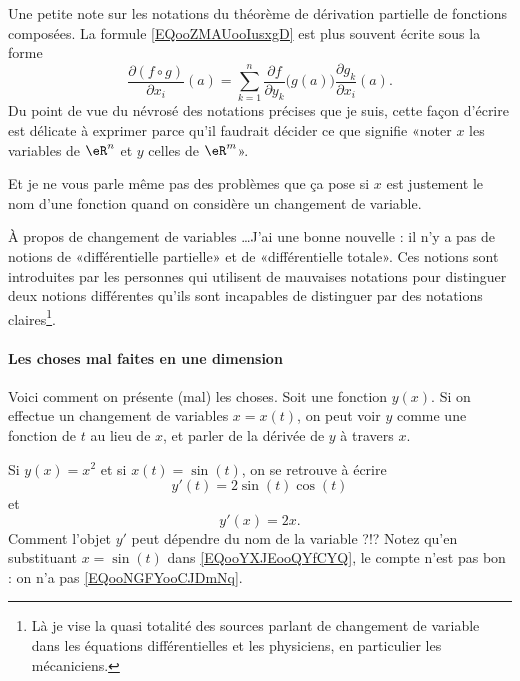 \begin{normaltext}
    Une petite note sur les notations du théorème de dérivation partielle de fonctions composées. La formule \eqref{EQooZMAUooIusxgD} est plus souvent écrite sous la forme
    \begin{equation}
		\frac{ \partial (f\circ g) }{ \partial x_i }(a)=\sum_{k=1}^n\frac{ \partial f }{ \partial y_k }\big( g(a) \big)\frac{ \partial g_k }{ \partial x_i }(a).
    \end{equation}
    Du point de vue du névrosé des notations précises que je suis, cette façon d'écrire est délicate à exprimer parce qu'il faudrait décider ce que signifie «noter \( x\) les variables de \( \eR^n\) et \( y\) celles de \( \eR^m\)».

    Et je ne vous parle même pas des problèmes que ça pose si \( x\) est justement le nom d'une fonction quand on considère un changement de variable.
\end{normaltext}

\begin{normaltext}
    À propos de changement de variables \ldots J'ai une bonne nouvelle : il n'y a pas de notions de «différentielle partielle» et de «différentielle totale». Ces notions sont introduites par les personnes qui utilisent de mauvaises notations pour distinguer deux notions différentes qu'ils sont incapables de distinguer par des notations claires\footnote{Là je vise la quasi totalité des sources parlant de changement de variable dans les équations différentielles et les physiciens, en particulier les mécaniciens.}.
\end{normaltext}

\paragraph{Les choses mal faites en une dimension}

    Voici comment on présente (mal) les choses. Soit une fonction \( y(x)\). Si on effectue un changement de variables \( x=x(t)\), on peut voir \( y\) comme une fonction de \( t\) au lieu de \( x\), et parler de la dérivée de \( y\) à travers \( x\).

    Si \( y(x)=x^2\) et si \( x(t)=\sin(t)\), on se retrouve à écrire
    \begin{equation}        \label{EQooNGFYooCJDmNq}
        y'(t)=2\sin(t)\cos(t)
    \end{equation}
    et 
    \begin{equation}        \label{EQooYXJEooQYfCYQ}
        y'(x)=2x.
    \end{equation}
    Comment l'objet \( y'\) peut dépendre du nom de la variable ?!? Notez qu'en substituant \( x=\sin(t)\) dans \eqref{EQooYXJEooQYfCYQ}, le compte n'est pas bon : on n'a pas \eqref{EQooNGFYooCJDmNq}.

